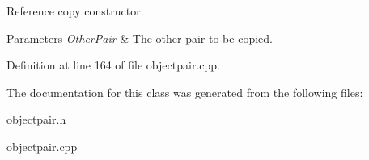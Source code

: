 Reference copy constructor. 


\begin{DoxyParams}{Parameters}
{\em OtherPair} & The other pair to be copied. \\
\hline
\end{DoxyParams}


Definition at line 164 of file objectpair.cpp.



The documentation for this class was generated from the following files:\begin{DoxyCompactItemize}
\item 
objectpair.h\item 
objectpair.cpp\end{DoxyCompactItemize}
